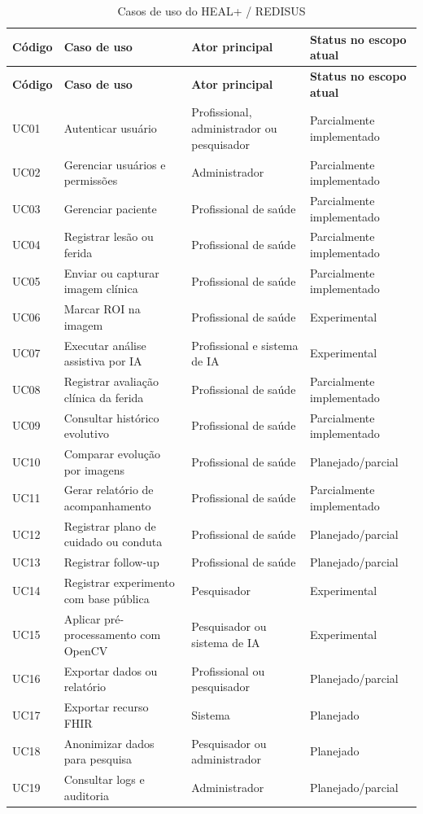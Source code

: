 \documentclass[
    12pt,
    oneside,
    a4paper,
    chapter=TITLE,
    brazil,
    sumario=tradicional,
    hidelinks
]{abntex2}
\begin{document}
\begin{longtable}{L{1.4cm}L{4.4cm}L{3.4cm}L{4.2cm}}
\caption{\label{tab:casos-uso-engenharia}Casos de uso do HEAL+ / REDISUS}\\
\toprule
\textbf{Código} & \textbf{Caso de uso} & \textbf{Ator principal} & \textbf{Status no escopo atual} \\
\midrule
\endfirsthead
\toprule
\textbf{Código} & \textbf{Caso de uso} & \textbf{Ator principal} & \textbf{Status no escopo atual} \\
\midrule
\endhead
UC01 & Autenticar usuário & Profissional, administrador ou pesquisador & Parcialmente implementado \\
UC02 & Gerenciar usuários e permissões & Administrador & Parcialmente implementado \\
UC03 & Gerenciar paciente & Profissional de saúde & Parcialmente implementado \\
UC04 & Registrar lesão ou ferida & Profissional de saúde & Parcialmente implementado \\
UC05 & Enviar ou capturar imagem clínica & Profissional de saúde & Parcialmente implementado \\
UC06 & Marcar ROI na imagem & Profissional de saúde & Experimental \\
UC07 & Executar análise assistiva por IA & Profissional e sistema de IA & Experimental \\
UC08 & Registrar avaliação clínica da ferida & Profissional de saúde & Parcialmente implementado \\
UC09 & Consultar histórico evolutivo & Profissional de saúde & Parcialmente implementado \\
UC10 & Comparar evolução por imagens & Profissional de saúde & Planejado/parcial \\
UC11 & Gerar relatório de acompanhamento & Profissional de saúde & Parcialmente implementado \\
UC12 & Registrar plano de cuidado ou conduta & Profissional de saúde & Planejado/parcial \\
UC13 & Registrar follow-up & Profissional de saúde & Planejado/parcial \\
UC14 & Registrar experimento com base pública & Pesquisador & Experimental \\
UC15 & Aplicar pré-processamento com OpenCV & Pesquisador ou sistema de IA & Experimental \\
UC16 & Exportar dados ou relatório & Profissional ou pesquisador & Planejado/parcial \\
UC17 & Exportar recurso FHIR & Sistema & Planejado \\
UC18 & Anonimizar dados para pesquisa & Pesquisador ou administrador & Planejado \\
UC19 & Consultar logs e auditoria & Administrador & Planejado/parcial \\
\bottomrule
\end{longtable}
\end{document}
